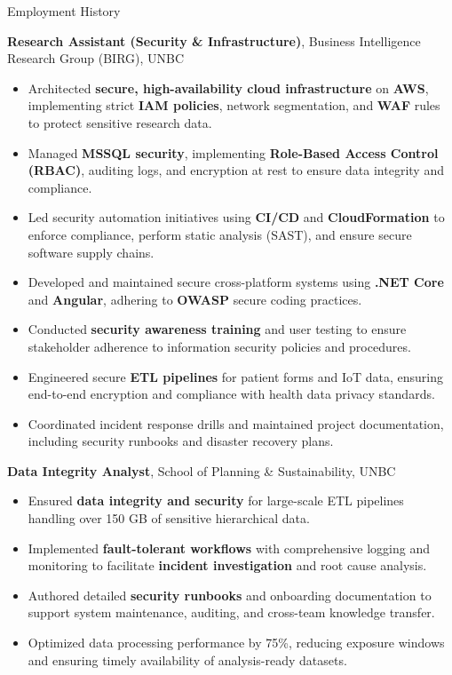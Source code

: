 \begin{rubric}{Employment History}

\entry*[2024 -- Present]
\textbf{Research Assistant (Security \& Infrastructure)}, Business Intelligence Research Group (BIRG), UNBC
\begin{itemize}[leftmargin=*, nosep, label={\tiny$\bullet$}]
\item Architected \textbf{secure, high-availability cloud infrastructure} on \textbf{AWS}, implementing strict \textbf{IAM policies}, network segmentation, and \textbf{WAF} rules to protect sensitive research data.
\item Managed \textbf{MSSQL security}, implementing \textbf{Role-Based Access Control (RBAC)}, auditing logs, and encryption at rest to ensure data integrity and compliance.
\item Led security automation initiatives using \textbf{CI/CD} and \textbf{CloudFormation} to enforce compliance, perform static analysis (SAST), and ensure secure software supply chains.
\item Developed and maintained secure cross-platform systems using \textbf{.NET Core} and \textbf{Angular}, adhering to \textbf{OWASP} secure coding practices.
\item Conducted \textbf{security awareness training} and user testing to ensure stakeholder adherence to information security policies and procedures.
\item Engineered secure \textbf{ETL pipelines} for patient forms and IoT data, ensuring end-to-end encryption and compliance with health data privacy standards.
\item Coordinated incident response drills and maintained project documentation, including security runbooks and disaster recovery plans.
\end{itemize}

    \textbf{Data Integrity Analyst}, School of Planning \& Sustainability, UNBC
    \begin{itemize}[leftmargin=*, nosep, label={\tiny$\bullet$}]
        \item Ensured \textbf{data integrity and security} for large-scale ETL pipelines handling over 150 GB of sensitive hierarchical data.
        \item Implemented \textbf{fault-tolerant workflows} with comprehensive logging and monitoring to facilitate \textbf{incident investigation} and root cause analysis.
        \item Authored detailed \textbf{security runbooks} and onboarding documentation to support system maintenance, auditing, and cross-team knowledge transfer.
        \item Optimized data processing performance by 75\%, reducing exposure windows and ensuring timely availability of analysis-ready datasets.
    \end{itemize}


\end{rubric}
